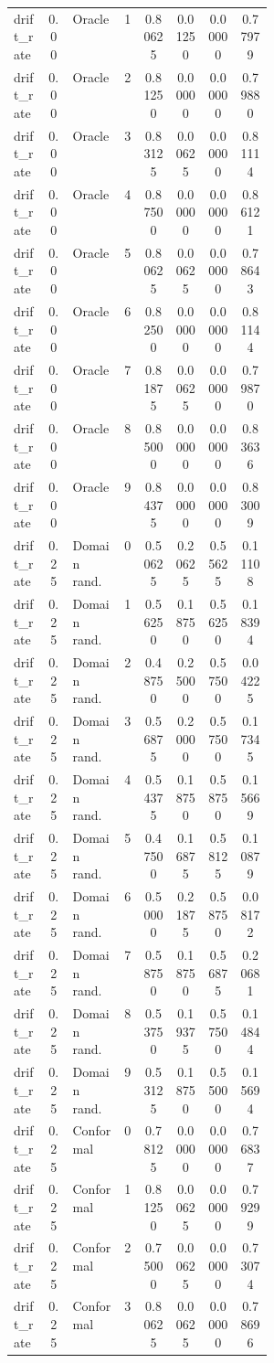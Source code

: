 \documentclass{article}
\begin{document}
\begin{center}
\begin{longtable}{p{0.13\linewidth}cp{0.20\linewidth}ccccc}
drift\_rate & 0.00 & Oracle & 1 & 0.80625 & 0.01250 & 0.00000 & 0.77979\\
drift\_rate & 0.00 & Oracle & 2 & 0.81250 & 0.00000 & 0.00000 & 0.79880\\
drift\_rate & 0.00 & Oracle & 3 & 0.83125 & 0.00625 & 0.00000 & 0.81114\\
drift\_rate & 0.00 & Oracle & 4 & 0.87500 & 0.00000 & 0.00000 & 0.86121\\
drift\_rate & 0.00 & Oracle & 5 & 0.80625 & 0.00625 & 0.00000 & 0.78643\\
drift\_rate & 0.00 & Oracle & 6 & 0.82500 & 0.00000 & 0.00000 & 0.81144\\
drift\_rate & 0.00 & Oracle & 7 & 0.81875 & 0.00625 & 0.00000 & 0.79870\\
drift\_rate & 0.00 & Oracle & 8 & 0.85000 & 0.00000 & 0.00000 & 0.83636\\
drift\_rate & 0.00 & Oracle & 9 & 0.84375 & 0.00000 & 0.00000 & 0.83009\\
drift\_rate & 0.25 & Domain rand. & 0 & 0.50625 & 0.20625 & 0.55625 & 0.11108\\
drift\_rate & 0.25 & Domain rand. & 1 & 0.56250 & 0.18750 & 0.56250 & 0.18394\\
drift\_rate & 0.25 & Domain rand. & 2 & 0.48750 & 0.25000 & 0.57500 & 0.04225\\
drift\_rate & 0.25 & Domain rand. & 3 & 0.56875 & 0.20000 & 0.57500 & 0.17345\\
drift\_rate & 0.25 & Domain rand. & 4 & 0.54375 & 0.18750 & 0.58750 & 0.15669\\
drift\_rate & 0.25 & Domain rand. & 5 & 0.47500 & 0.16875 & 0.58125 & 0.10879\\
drift\_rate & 0.25 & Domain rand. & 6 & 0.50000 & 0.21875 & 0.58750 & 0.08172\\
drift\_rate & 0.25 & Domain rand. & 7 & 0.58750 & 0.18750 & 0.56875 & 0.20681\\
drift\_rate & 0.25 & Domain rand. & 8 & 0.53750 & 0.19375 & 0.57500 & 0.14844\\
drift\_rate & 0.25 & Domain rand. & 9 & 0.53125 & 0.18750 & 0.55000 & 0.15694\\
drift\_rate & 0.25 & Conformal & 0 & 0.78125 & 0.00000 & 0.00000 & 0.76837\\
drift\_rate & 0.25 & Conformal & 1 & 0.81250 & 0.00625 & 0.00000 & 0.79299\\
drift\_rate & 0.25 & Conformal & 2 & 0.75000 & 0.00625 & 0.00000 & 0.73074\\
drift\_rate & 0.25 & Conformal & 3 & 0.80625 & 0.00625 & 0.00000 & 0.78696\\

\end{longtable}
\end{center}
\end{document}
